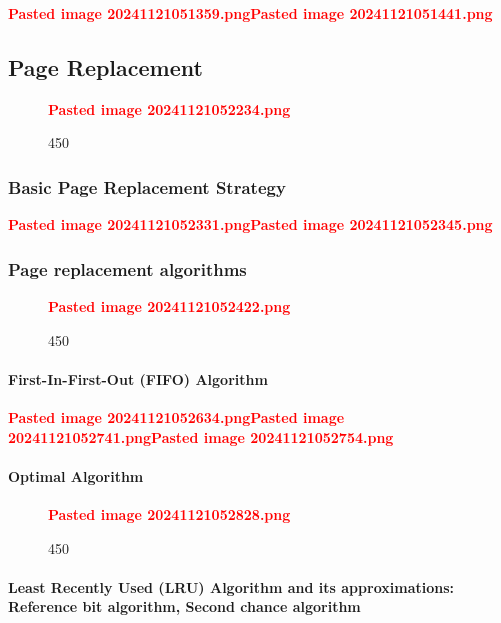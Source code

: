 \textcolor{red}{\textbf{Pasted image 20241121051359.png}}\textcolor{red}{\textbf{Pasted image 20241121051441.png}}

\subsection*{Page Replacement}

\begin{figure}
\centering
\textcolor{red}{\textbf{Pasted image 20241121052234.png}}
\caption{450}
\end{figure}

\subsubsection*{Basic Page Replacement Strategy}

\textcolor{red}{\textbf{Pasted image 20241121052331.png}}\textcolor{red}{\textbf{Pasted image 20241121052345.png}}

\subsubsection*{Page replacement algorithms}

\begin{figure}
\centering
\textcolor{red}{\textbf{Pasted image 20241121052422.png}}
\caption{450}
\end{figure}

\paragraph*{First-In-First-Out (FIFO) Algorithm}

\textcolor{red}{\textbf{Pasted image 20241121052634.png}}\textcolor{red}{\textbf{Pasted image 20241121052741.png}}\textcolor{red}{\textbf{Pasted image 20241121052754.png}}

\paragraph*{Optimal Algorithm}

\begin{figure}
\centering
\textcolor{red}{\textbf{Pasted image 20241121052828.png}}
\caption{450}
\end{figure}

\paragraph*{Least Recently Used (LRU) Algorithm and its approximations:
Reference bit algorithm, Second chance algorithm}

